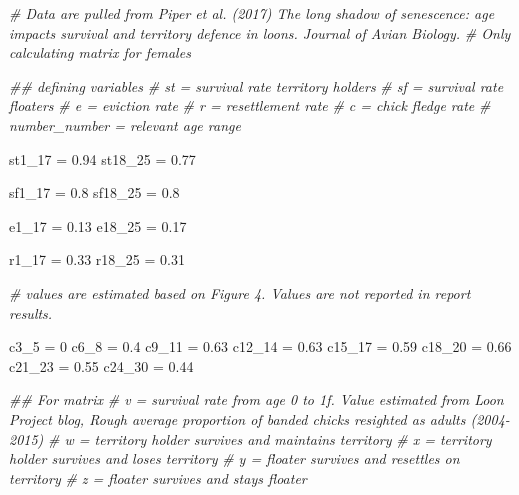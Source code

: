 \documentclass[]{article}
\newenvironment{Shaded}{\begin{snugshade}}{\end{snugshade}}
\newcommand{\CommentTok}[1]{\textcolor[rgb]{0.56,0.35,0.01}{\textit{#1}}}
\newcommand{\DecValTok}[1]{\textcolor[rgb]{0.00,0.00,0.81}{#1}}
\newcommand{\FloatTok}[1]{\textcolor[rgb]{0.00,0.00,0.81}{#1}}
\newcommand{\NormalTok}[1]{#1}
\newcommand{\StringTok}[1]{\textcolor[rgb]{0.31,0.60,0.02}{#1}}
\begin{document}
\begin{Shaded}
\begin{Highlighting}[]
\CommentTok{# Data are pulled from Piper et al. (2017) The long shadow of senescence: age impacts survival and territory defence in loons. Journal of Avian Biology. }
\CommentTok{# Only calculating matrix for females}

\CommentTok{## defining variables}
\CommentTok{# st = survival rate territory holders}
\CommentTok{# sf = survival rate floaters}
\CommentTok{# e = eviction rate}
\CommentTok{# r = resettlement rate}
\CommentTok{# c = chick fledge rate}
\CommentTok{# number_number = relevant age range}

\NormalTok{st1_}\DecValTok{17}\NormalTok{ =}\StringTok{ }\FloatTok{0.94}
\NormalTok{st18_}\DecValTok{25}\NormalTok{ =}\StringTok{ }\FloatTok{0.77}

\NormalTok{sf1_}\DecValTok{17}\NormalTok{ =}\StringTok{ }\FloatTok{0.8}
\NormalTok{sf18_}\DecValTok{25}\NormalTok{ =}\StringTok{ }\FloatTok{0.8}

\NormalTok{e1_}\DecValTok{17}\NormalTok{ =}\StringTok{ }\FloatTok{0.13}
\NormalTok{e18_}\DecValTok{25}\NormalTok{ =}\StringTok{ }\FloatTok{0.17}

\NormalTok{r1_}\DecValTok{17}\NormalTok{ =}\StringTok{ }\FloatTok{0.33}
\NormalTok{r18_}\DecValTok{25}\NormalTok{ =}\StringTok{ }\FloatTok{0.31}

\CommentTok{# values are estimated based on Figure 4. Values are not reported in report results.}

\NormalTok{c3_}\DecValTok{5}\NormalTok{ =}\StringTok{ }\DecValTok{0}
\NormalTok{c6_}\DecValTok{8}\NormalTok{ =}\StringTok{ }\FloatTok{0.4}
\NormalTok{c9_}\DecValTok{11}\NormalTok{ =}\StringTok{ }\FloatTok{0.63}
\NormalTok{c12_}\DecValTok{14}\NormalTok{ =}\StringTok{ }\FloatTok{0.63}
\NormalTok{c15_}\DecValTok{17}\NormalTok{ =}\StringTok{ }\FloatTok{0.59}
\NormalTok{c18_}\DecValTok{20}\NormalTok{ =}\StringTok{ }\FloatTok{0.66}
\NormalTok{c21_}\DecValTok{23}\NormalTok{ =}\StringTok{ }\FloatTok{0.55}
\NormalTok{c24_}\DecValTok{30}\NormalTok{ =}\StringTok{ }\FloatTok{0.44}

\CommentTok{## For matrix}
\CommentTok{# v = survival rate from age 0 to 1f. Value estimated from Loon Project blog, Rough average proportion of banded chicks resighted as adults (2004-2015) }
\CommentTok{# w = territory holder survives and maintains territory}
\CommentTok{# x = territory holder survives and loses territory}
\CommentTok{# y = floater survives and resettles on territory}
\CommentTok{# z = floater survives and stays floater}


\end{Highlighting}
\end{Shaded}
\end{document}
